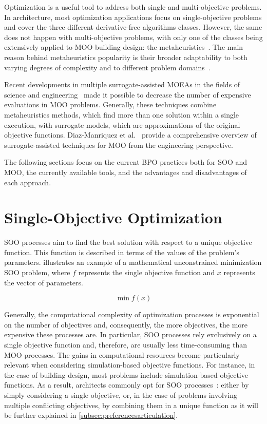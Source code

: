 Optimization is a useful tool to address both single and multi-objective problems. In architecture, most optimization applications focus on single-objective problems and cover the three different derivative-free algorithms classes. However, the same does not happen with multi-objective problems, with only one of the classes being extensively applied to \ac{MOO} building design: the metaheuristics~\cite{Hamdy2016}. The main reason behind metaheuristics popularity is their broader adaptability to both varying degrees of complexity and to different problem domains~\cite{BlumRoli2003Metaheuristics}.
	
Recent developments in multiple surrogate-assisted \acp{MOEA} in the fields of science and engineering~\cite{Zapotecas-Martinez2016,Hussein2016} made it possible to decrease the number of expensive evaluations in \ac{MOO} problems. Generally, these techniques combine metaheuristics methods, which find more than one solution within a single execution, with surrogate models, which are approximations of the original objective functions. Diaz-Manriquez et al.~\cite{Diaz-Manriquez2016} provide a comprehensive overview of surrogate-assisted techniques for \ac{MOO} from the engineering perspective. 

The following sections focus on the current \ac{BPO} practices both for \ac{SOO} and \ac{MOO}, the currently available tools, and the advantages and disadvantages of each approach.
	
\section{Single-Objective Optimization}
	
\ac{SOO} processes aim to find the best solution with respect to a unique objective function. This function is described in terms of the values of the problem's parameters.  illustrates an example of a mathematical unconstrained minimization \ac{SOO} problem, where $f$ represents the single objective function and $x$ represents the vector of parameters.
		
\begin{equation} \label{eq:soo}
   	\min f(x) 
\end{equation}

Generally, the computational complexity of optimization processes is exponential on the number of objectives and, consequently, the more objectives, the more expensive these processes are. In particular, \ac{SOO} processes rely exclusively on a single objective function and, therefore, are usually less time-consuming than \ac{MOO} processes. The gains in computational resources become particularly relevant when considering simulation-based objective functions. For instance, in the case of building design, most problems include simulation-based objective functions. As a result, architects commonly opt for \ac{SOO} processes~\cite{Wortmann2017Opossum}: either by simply considering a single objective, or, in the case of problems involving multiple conflicting objectives, by combining them in a unique function as it will be further explained in \cref{subsec:preferencesarticulation}.
	

